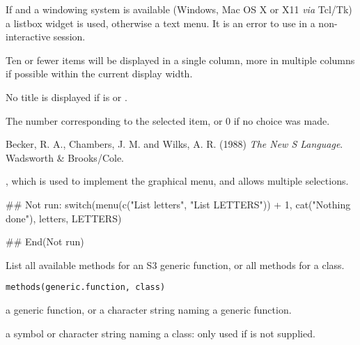 %
\begin{Details}\relax
If  and a windowing system is available
(Windows, Mac OS X or X11 \emph{via} Tcl/Tk) a listbox widget is
used, otherwise a text menu.  It is an error to use  in a
non-interactive session.

Ten or fewer items will be displayed in a single column, more in
multiple columns if possible within the current display width.

No title is displayed if  is  or .
\end{Details}
%
\begin{Value}
The number corresponding to the selected item, or 0 if no choice was
made.
\end{Value}
%
\begin{References}\relax
Becker, R. A., Chambers, J. M. and Wilks, A. R. (1988)
\emph{The New S Language}.
Wadsworth \& Brooks/Cole.
\end{References}
%
\begin{SeeAlso}\relax
{}, which is used to implement the graphical
menu, and allows multiple selections.
\end{SeeAlso}
%
\begin{Examples}
\begin{ExampleCode}
## Not run: 
switch(menu(c("List letters", "List LETTERS")) + 1,
       cat("Nothing done\n"), letters, LETTERS)

## End(Not run)
\end{ExampleCode}
\end{Examples}
%
\begin{Description}\relax
List all available methods for an S3 generic function, or all
methods for a class.
\end{Description}
%
\begin{Usage}
\begin{verbatim}
methods(generic.function, class)
\end{verbatim}
\end{Usage}
%
\begin{Arguments}
\begin{ldescription}
\item[\code{generic.function}] a generic function, or a character string naming a
generic function.
\item[\code{class}] a symbol or character string naming a class: only used if
 is not supplied.
\end{ldescription}
\end{Arguments}
